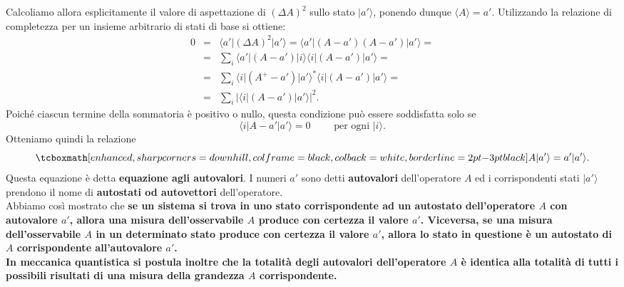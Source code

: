 \documentclass[a4paper,12pt,oneside]{book}
\begin{document}
Calcoliamo allora esplicitamente il valore di aspettazione di $(\Delta A )^2$ sullo stato $\vert a' \rangle$, ponendo dunque $\langle A \rangle = a'$. Utilizzando la relazione di completezza per un insieme arbitrario di stati di base si ottiene:
	\begin{eqnarray}
		0 & = & \langle a' \vert (\Delta A )^2 \vert a'\rangle = \langle a' \vert (A-a' )(A-a') \vert a'\rangle= \nonumber \\
		& = & \sum _i \langle a' \vert (A-a' ) \vert i \rangle \langle i \vert (A-a' ) \vert a' \rangle = \nonumber \\
		& = & \sum _i \langle i \vert (A^{+}-a' ) \vert a' \rangle ^* \langle i \vert (A-a' ) \vert a' \rangle = \nonumber \\
		& = & \sum _i \vert \langle i \vert (A-a' ) \vert a' \rangle \vert ^2.
	\end{eqnarray}
Poiché ciascun termine della sommatoria è positivo o nullo, questa condizione può essere soddisfatta solo se
	\begin{equation}
		\langle i \vert A-a' \vert a' \rangle =0 \qquad \textrm{ per ogni } \vert i \rangle .
	\end{equation}
Otteniamo quindi la relazione
	\begin{equation}
		\tcboxmath[enhanced, sharp corners=downhill, colframe=black, colback=white, borderline={2pt}{-3pt}{black}]{
			A \vert a' \rangle =a' \vert a' \rangle .
			}
	\end{equation}
Questa equazione è detta \textbf{equazione agli autovalori}. I numeri $a'$ sono detti \textbf{autovalori} dell'operatore $A$ ed i corrispondenti stati $\vert a' \rangle $ prendono il nome di \textbf{autostati od autovettori} dell'operatore.\\

Abbiamo così mostrato che \textbf{se un sistema si trova in uno stato corrispondente ad un autostato dell'operatore $A$ con autovalore $a'$, allora una misura dell'osservabile $A$ produce con certezza il valore $a'$. Viceversa, se una misura dell'osservabile $A$ in un determinato stato produce con certezza il valore $a'$, allora lo stato in questione è un autostato di $A$ corrispondente all'autovalore $a'$.}\\

\textbf{In meccanica quantistica si postula inoltre che la totalità degli autovalori dell'operatore $A$ è identica alla totalità di tutti i possibili risultati di una misura della grandezza $A$ corrispondente.}\\
\end{document}
